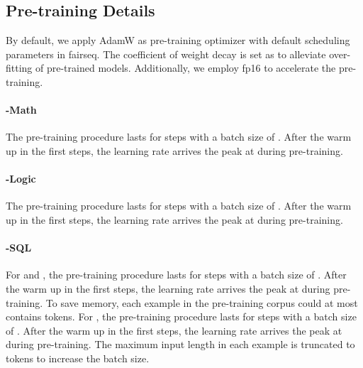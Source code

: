 \subsection{Pre-training Details}

By default, we apply AdamW as pre-training optimizer with default scheduling parameters in fairseq.
The coefficient of weight decay is set as  to alleviate over-fitting of pre-trained models.
Additionally, we employ fp16 to accelerate the pre-training.

\paragraph{\ours-Math} The pre-training procedure lasts for  steps with a batch size of . After the warm up in the first  steps, the learning rate arrives the peak at  during pre-training.

\paragraph{\ours-Logic} The pre-training procedure lasts for  steps with a batch size of . After the warm up in the first  steps, the learning rate arrives the peak at  during pre-training.

\paragraph{\ours-SQL} For \oursbart and \oursroberta, the pre-training procedure lasts for  steps with a batch size of . After the warm up in the first  steps, the learning rate arrives the peak at  during pre-training. To save memory, each example in the pre-training corpus could at most contains  tokens.
For \ourstfive, the pre-training procedure lasts for  steps with a batch size of . After the warm up in the first  steps, the learning rate arrives the peak at  during pre-training. The maximum input length in each example is truncated to  tokens to increase the batch size.

